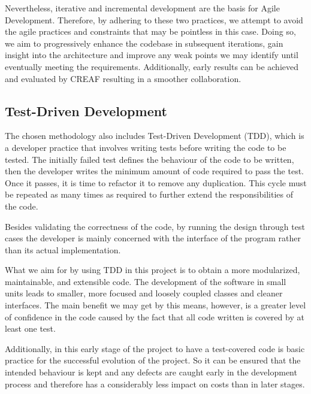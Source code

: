Nevertheless, iterative and incremental development are the basis for Agile Development. Therefore, by adhering to these two practices, we attempt to avoid the agile practices and constraints that may be pointless in this case. Doing so, we aim to progressively enhance the codebase in subsequent iterations, gain insight into the architecture and improve any weak points we may identify until eventually meeting the requirements. Additionally, early results can be achieved and evaluated by CREAF resulting in a smoother collaboration.

\subsection{Test-Driven Development}

The chosen methodology also includes Test-Driven Development (TDD), which is a developer practice that involves writing tests before writing the code to be tested. The initially failed test defines the behaviour of the code to be written, then the developer writes the minimum amount of code required to pass the test. Once it passes, it is time to refactor it to remove any duplication. This cycle must be repeated as many times as required to further extend the responsibilities of the code.

Besides validating the correctness of the code, by running the design through test cases the developer is mainly concerned with the interface of the program rather than its actual implementation.

What we aim for by using TDD in this project is to obtain a more modularized, maintainable, and extensible code. The development of the software in small units leads to smaller, more focused and loosely coupled classes and cleaner interfaces. The main benefit we may get by this means, however, is a greater level of confidence in the code caused by the fact that all code written is covered by at least one test.

Additionally, in this early stage of the project to have a test-covered code is basic practice for the successful evolution of the project. So it can be ensured that the intended behaviour is kept and any defects are caught early in the development process and therefore has a considerably less impact on costs than in later stages.
